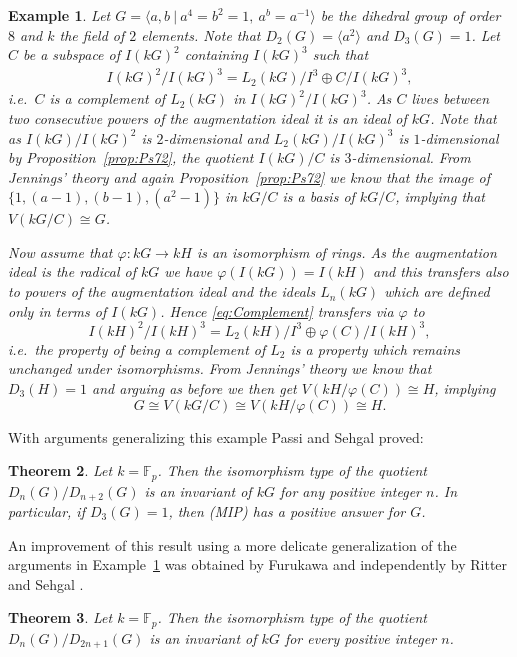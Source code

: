\documentclass[11pt, a4paper]{amsart}
\newtheorem{theorem}{Theorem}[section]
\newtheorem{example}[theorem]{Example}
\theoremstyle{definition}
\begin{document}
\begin{example} \label{ex:LieComp}
Let $G = \langle a,b \ | \ a^4 = b^2=1, \ a^b = a^{-1} \rangle$ be the dihedral group of order $8$ and $k$ the field of $2$ elements. Note that $D_2(G) = \langle a ^2 \rangle$ and $D_3(G) = 1$. Let $C$ be a subspace of $I(kG)^2$ containing $I(kG)^3$ such that 
\begin{align}\label{eq:Complement}
I(kG)^2/I(kG)^3 = L_2(kG)/I^3 \oplus C/I(kG)^3, 
\end{align}
i.e.\ $C$ is a complement of $L_2(kG)$ in $I(kG)^2/I(kG)^3$. As $C$ lives between two consecutive powers of the augmentation ideal it is an ideal of $kG$. Note that as $I(kG)/I(kG)^2$ is $2$-dimensional and $L_2(kG)/I(kG)^3$ is $1$-dimensional by Proposition~\ref{prop:Ps72}, the quotient $I(kG)/C$ is $3$-dimensional. From Jennings' theory and again Proposition~\ref{prop:Ps72} we know that the image of $\{1, (a-1) , (b-1), (a^2-1) \}$  in $kG/C$ is a basis of $kG/C$, implying that $V(kG/C) \cong G$.

Now assume that $\varphi: kG \rightarrow kH$ is an isomorphism of rings. As the augmentation ideal is the radical of $kG$ we have $\varphi(I(kG)) = I(kH)$ and this transfers also to powers of the augmentation ideal and the ideals $L_n(kG)$ which are defined only in terms of $I(kG)$. Hence \eqref{eq:Complement} transfers via $\varphi$ to
\[I(kH)^2/I(kH)^3 = L_2(kH)/I^3 \oplus \varphi(C)/I(kH)^3,  \]
i.e.\ the property of being a complement of $L_2$ is a property which remains unchanged under isomorphisms. From Jennings' theory we know that $D_3(H) = 1$ and arguing as before we then get $V(kH/\varphi(C)) \cong H$, implying
\[G \cong V(kG/C) \cong V(kH/\varphi(C)) \cong H. \]
\end{example}

With arguments generalizing this example Passi and Sehgal proved:
\begin{theorem}\label{th:LP72}\cite{PassiSehgal72}
Let $k = \mathbb{F}_p$. Then the isomorphism type of the quotient $D_n(G)/D_{n+2}(G)$ is an invariant of $kG$ for any positive integer $n$. In particular, if $D_3(G) = 1$, then (MIP) has a positive answer for $G$.
\end{theorem}

An improvement of this result using a more delicate generalization of the arguments in Example~\ref{ex:LieComp} was obtained by Furukawa \cite{Furukawa81} and independently by Ritter and Sehgal \cite{RitterSehgal83}.

\begin{theorem} \cite{Furukawa81, RitterSehgal83} 
Let $k = \mathbb{F}_p$. Then the isomorphism type of the quotient $D_n(G)/D_{2n+1}(G)$ is an invariant of $kG$ for every positive integer $n$.
\end{theorem}
\end{document}
